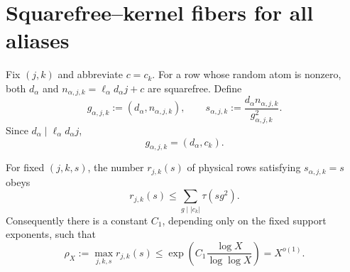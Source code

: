 \section{Squarefree--kernel fibers for all aliases}
\label{sec:tpc43-product-fibers}

Fix \((j,k)\) and abbreviate \(c=c_k\).  For a row whose random atom is
nonzero, both \(d_\alpha\) and
\(n_{\alpha,j,k}=\ell_\alpha d_\alpha j+c\) are squarefree.  Define
\begin{equation}
 g_{\alpha,j,k}:=(d_\alpha,n_{\alpha,j,k}),
 \qquad
 s_{\alpha,j,k}
 :=\frac{d_\alpha n_{\alpha,j,k}}{g_{\alpha,j,k}^2}.
 \label{eq:tpc43-row-kernel-label}
\end{equation}
Since \(d_\alpha\mid \ell_\alpha d_\alpha j\),
\begin{equation}
 g_{\alpha,j,k}=(d_\alpha,c_k).
 \label{eq:tpc43-gcd-is-intercept}
\end{equation}

\begin{lemma}
\label{lem:tpc43-kernel-fiber-bound}
For fixed \((j,k,s)\), the number
\(r_{j,k}(s)\) of physical rows satisfying
\(s_{\alpha,j,k}=s\) obeys
\begin{equation}
 r_{j,k}(s)
 \le
 \sum_{g\mid |c_k|}\tau(sg^2).
 \label{eq:tpc43-kernel-fiber-divisor-bound}
\end{equation}
Consequently there is a constant \(C_1\), depending only on the fixed
support exponents, such that
\begin{equation}
 \rho_X:=\max_{j,k,s}r_{j,k}(s)
 \le
 \exp\!\left(C_1\frac{\log X}{\log\log X}\right)
 =X^{o(1)}.
 \label{eq:tpc43-rho-bound}
\end{equation}
\end{lemma}


